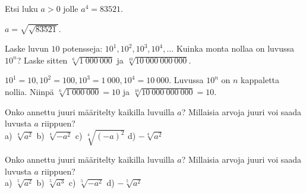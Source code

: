 \begin{tehtavasivu}
\begin{tehtava}
Etsi luku $a>0$ jolle $a^4=83521$.
\begin{vastaus}
$a=\sqrt{\sqrt{83521}}$.
\end{vastaus}
\end{tehtava}



\begin{tehtava}
Laske luvun $10$ potensseja: $10^1, 10^2, 10^3, 10^4, \ldots$ Kuinka monta nollaa on luvussa $10^n$? Laske sitten $\sqrt[6]{1~000~000}$ ja $\sqrt[10]{10~000~000~000}$.

\begin{vastaus}
$10^1 = 10, 10^2 = 100, 10^3 = 1~000, 10^4 = 10~000$. Luvussa $10^n$ on $n$ kappaletta nollia. Niinpä $\sqrt[6]{1~000~000} = 10$ ja $\sqrt[10]{10~000~000~000} = 10$.
\end{vastaus}
\end{tehtava}

\begin{tehtava}
Onko annettu juuri määritelty kaikilla luvuilla $a$? Millaisia arvoja juuri voi saada luvusta $a$ riippuen?\\
a) $\sqrt[4]{a^2}$ \quad b) $\sqrt[4]{-a^2}$ \quad c) $\sqrt[4]{(-a)^2}$ \quad d) $- \sqrt[4]{a^2}$

\begin{vastaus}

\begin{alakohdat}
\end{alakohdat}
\end{vastaus}
\end{tehtava}

\begin{tehtava}
Onko annettu juuri määritelty kaikilla luvuilla $a$? Millaisia arvoja juuri voi saada luvusta $a$ riippuen?\\
a) $\sqrt[5]{a^2}$ \quad b) $\sqrt[5]{a^3}$ \quad c) $\sqrt[5]{-a^2}$ \quad d) $- \sqrt[5]{a^2}$


\end{tehtava}
\end{tehtavasivu}
